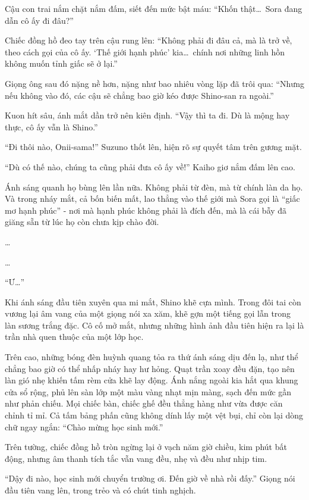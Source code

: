 \documentclass[../main.tex]{subfiles}
\begin{document}
Cậu con trai nắm chặt nắm đấm, siết đến mức bật máu: ``Khốn thật\dots\ Sora đang dẫn cô ấy đi đâu?''

Chiếc đồng hồ đeo tay trên cậu rung lên: ``Không phải đi đâu cả, mà là trở về, theo cách gọi của cô ấy. `Thế giới hạnh phúc' kia\dots\ chính nơi những linh hồn không muốn tỉnh giấc sẽ ở lại.''

Giọng ông sau đó nặng nề hơn, nặng như bao nhiêu vòng lặp đã trôi qua: ``Nhưng nếu không vào đó, các cậu sẽ chẳng bao giờ kéo được Shino-san ra ngoài.''

Kuon hít sâu, ánh mắt dần trở nên kiên định. ``Vậy thì ta đi. Dù là mộng hay thực, cô ấy vẫn là Shino.''

``Đi thôi nào, Onii-sama!'' Suzuno thốt lên, hiện rõ sự quyết tâm trên gương mặt.

``Dù có thế nào, chúng ta cũng phải đưa cô ấy về!'' Kaiho giơ nắm đấm lên cao.

Ánh sáng quanh họ bùng lên lần nữa. Không phải từ đèn, mà từ chính làn da họ. Và trong nháy mắt, cả bốn biến mất, lao thẳng vào thế giới mà Sora gọi là ``giấc mơ hạnh phúc'' - nơi mà hạnh phúc không phải là đích đến, mà là cái bẫy đã giăng sẵn từ lúc họ còn chưa kịp chào đời.

\dots

\dots

\ct

``Ư\dots''

Khi ánh sáng đầu tiên xuyên qua mi mắt, Shino khẽ cựa mình. Trong đôi tai còn vương lại âm vang của một giọng nói xa xăm, khẽ gợn một tiếng gọi lẫn trong làn sương trắng đặc. Cô cố mở mắt, nhưng những hình ảnh đầu tiên hiện ra lại là trần nhà quen thuộc của một lớp học.

Trên cao, những bóng đèn huỳnh quang tỏa ra thứ ánh sáng dịu đến lạ, như thể chẳng bao giờ có thể nhấp nháy hay hư hỏng. Quạt trần xoay đều đặn, tạo nên làn gió nhẹ khiến tấm rèm cửa khẽ lay động. Ánh nắng ngoài kia hắt qua khung cửa sổ rộng, phủ lên sàn lớp một màu vàng nhạt mịn màng, sạch đến mức gần như phản chiếu. Mọi chiếc bàn, chiếc ghế đều thẳng hàng như vừa được căn chỉnh tỉ mỉ. Cả tấm bảng phấn cũng không dính lấy một vệt bụi, chỉ còn lại dòng chữ ngay ngắn: ``Chào mừng học sinh mới.''

Trên tường, chiếc đồng hồ tròn ngừng lại ở vạch năm giờ chiều, kim phút bất động, nhưng âm thanh tích tắc vẫn vang đều, nhẹ và đều như nhịp tim.

``Dậy đi nào, học sinh mới chuyển trường ơi. Đến giờ về nhà rồi đấy.''
Giọng nói đầu tiên vang lên, trong trẻo và có chút tinh nghịch.
\end{document}

